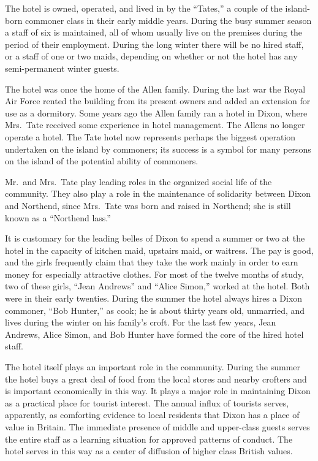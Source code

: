 \documentclass[openany,nobib]{tufte-book}
\begin{document}
The hotel is owned, operated, and lived in by the ``Tates,'' a couple of
the island-born commoner class in their early middle years. During the
busy summer season a staff of six is maintained, all of whom usually
live on the premises during the period of their employment. During the
long winter there will be no hired staff, or a staff of one or two
maids, depending on whether or not the hotel has any semi-permanent
winter guests.

The hotel was once the home of the Allen family. During the last war the
Royal Air Force rented the building from its present owners and added an
extension for use as a dormitory. Some years ago the Allen family ran a
hotel in Dixon, where Mrs.~Tate received some experience in hotel
management. The Allens no longer operate a hotel. The Tate hotel now
represents perhaps the biggest operation undertaken on the island by
commoners; its success is a symbol for many persons on the island of the
potential ability of commoners.

Mr.~and Mrs.~Tate play leading roles in the organized social life of the
community. They also play a role in the maintenance of solidarity
between Dixon and Northend, since Mrs.~Tate was born and raised in
Northend; she is still known as a ``Northend lass.''

It is customary for the leading belles of Dixon to spend a summer or two
at the hotel in the capacity of kitchen maid, upstairs maid, or
waitress. The pay is good, and the girls frequently claim that they take
the work mainly in order to earn money for especially attractive
clothes. For most of the twelve months of study, two of these girls,
``Jean Andrews'' and ``Alice Simon,'' worked at the hotel. Both were in
their early twenties. During the summer the hotel always hires a Dixon
commoner, ``Bob Hunter,'' as cook; he is about thirty years old,
unmarried, and lives during the winter on his family's croft. For the
last few years, Jean Andrews, Alice Simon, and Bob Hunter have formed
the core of the hired hotel staff.

The hotel itself plays an important role in the community. During the
summer the hotel buys a great deal of food from the local stores and
nearby crofters and is important economically in this way. It plays a
major role in maintaining Dixon as a practical place for tourist
interest. The annual influx of tourists serves, apparently, as
comforting evidence to local residents that Dixon has a place of value
in Britain. The immediate presence of middle and upper-class guests
serves the entire staff as a learning situation for approved patterns of
conduct. The hotel serves in this way as a center of diffusion of higher
class British values.
\end{document}
